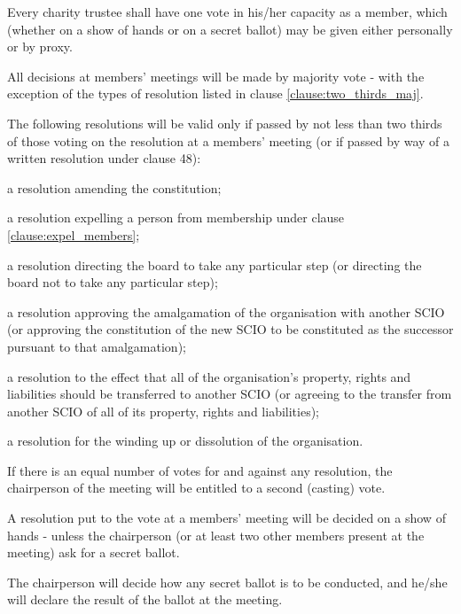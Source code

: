 ﻿\documentclass[a4paper,11pt,onecolumn ]{article}
\begin{document}
\begin{legal}
\item Every charity trustee shall have one vote in his/her capacity as a member, which (whether on a show of hands or on a secret ballot) may be given either personally or by proxy.
\item All decisions at members' meetings will be made by majority vote - with the exception of the types of resolution listed in clause \ref{clause:two_thirds_maj}.
\item \label{clause:two_thirds_maj} The following resolutions will be valid only if passed by not less than two thirds of those voting on the resolution at a members’ meeting (or if passed by way of a written resolution under clause 48):
    \begin{legal}
        \item a resolution amending the constitution;
        \item a resolution expelling a person from membership under clause \ref{clause:expel_members};
        \item a resolution directing the board to take any particular step (or directing the board not to take any particular step);
        \item a resolution approving the amalgamation of the organisation with another SCIO (or approving the constitution of the new SCIO to be constituted as the successor pursuant to that amalgamation);
        \item a resolution to the effect that all of the organisation’s property, rights and liabilities should be transferred to another SCIO (or agreeing to the transfer from another SCIO of all of its property, rights and liabilities);
        \item a resolution for the winding up or dissolution of the organisation.
    \end{legal}
\item If there is an equal number of votes for and against any resolution, the chairperson of the meeting will be entitled to a second (casting) vote.
\item A resolution put to the vote at a members' meeting will be decided on a show of hands - unless the chairperson (or at least two other members present at the meeting) ask for a secret ballot.
\item The chairperson will decide how any secret ballot is to be conducted, and he/she will declare the result of the ballot at the meeting.
\end{legal}
\end{document}
